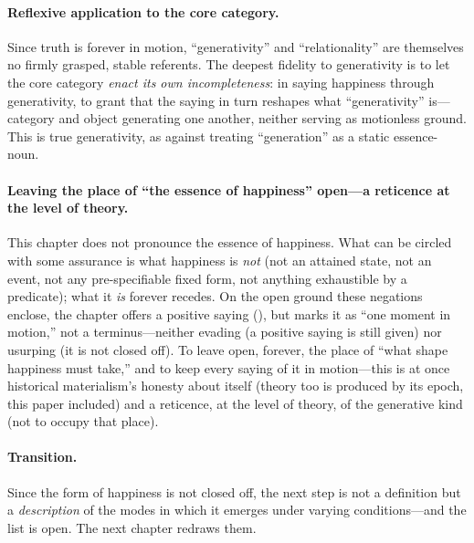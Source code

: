 \paragraph{Reflexive application to the core category.} Since truth is forever in motion, ``generativity'' and ``relationality'' are themselves no firmly grasped, stable referents. The deepest fidelity to generativity is to let the core category \emph{enact its own incompleteness}: in saying happiness through generativity, to grant that the saying in turn reshapes what ``generativity'' is---category and object generating one another, neither serving as motionless ground. This is true generativity, as against treating ``generation'' as a static essence-noun.

\paragraph{Leaving the place of ``the essence of happiness'' open---a reticence at the level of theory.} This chapter does not pronounce the essence of happiness. What can be circled with some assurance is what happiness is \emph{not} (not an attained state, not an event, not any pre-specifiable fixed form, not anything exhaustible by a predicate); what it \emph{is} forever recedes. On the open ground these negations enclose, the chapter offers a positive saying (), but marks it as ``one moment in motion,'' not a terminus---neither evading (a positive saying is still given) nor usurping (it is not closed off). To leave open, forever, the place of ``what shape happiness must take,'' and to keep every saying of it in motion---this is at once historical materialism's honesty about itself (theory too is produced by its epoch, this paper included) and a reticence, at the level of theory, of the generative kind (not to occupy that place).

\paragraph{Transition.} Since the form of happiness is not closed off, the next step is not a definition but a \emph{description} of the modes in which it emerges under varying conditions---and the list is open. The next chapter redraws them.
